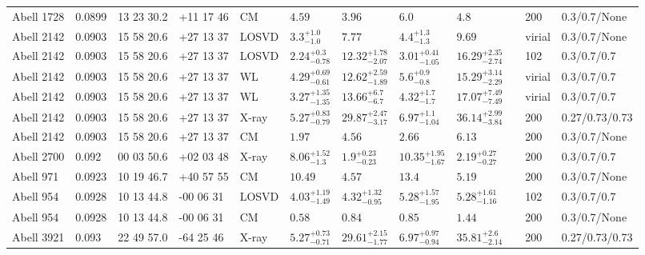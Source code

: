 \begin{landscape}
\begin{center}
{\begin{longtable}{llllllllllll}
Abell 1728 & 0.0899 & 13 23 30.2 & +11 17 46 & CM & ${4.59}^{}_{}$ & ${3.96}^{}_{}$ & ${6.0}^{}_{}$ & ${4.8}^{}_{}$ & \citet{RI06.1} & 200 & 0.3/0.7/None \\
Abell 2142 & 0.0903 & 15 58 20.6 & +27 13 37 & LOSVD & ${3.3}^{+1.0}_{-1.0}$ & ${7.77}^{}_{}$ & ${4.4}^{+1.3}_{-1.3}$ & ${9.69}^{}_{}$ & \citet{AB11.1} & virial & 0.3/0.7/None \\
Abell 2142 & 0.0903 & 15 58 20.6 & +27 13 37 & LOSVD & ${2.24}^{+0.3}_{-0.78}$ & ${12.32}^{+1.78}_{-2.07}$ & ${3.01}^{+0.41}_{-1.05}$ & ${16.29}^{+2.35}_{-2.74}$ & \citet{WO10.1} & 102 & 0.3/0.7/0.7 \\
Abell 2142 & 0.0903 & 15 58 20.6 & +27 13 37 & WL & ${4.29}^{+0.69}_{-0.61}$ & ${12.62}^{+2.59}_{-1.89}$ & ${5.6}^{+0.9}_{-0.8}$ & ${15.29}^{+3.14}_{-2.29}$ & \citet{UM09.1} & virial & 0.3/0.7/0.7 \\
Abell 2142 & 0.0903 & 15 58 20.6 & +27 13 37 & WL & ${3.27}^{+1.35}_{-1.35}$ & ${13.66}^{+6.7}_{-6.7}$ & ${4.32}^{+1.7}_{-1.7}$ & ${17.07}^{+7.49}_{-7.49}$ & \citet{OK08.1} & virial & 0.3/0.7/0.7 \\
Abell 2142 & 0.0903 & 15 58 20.6 & +27 13 37 & X-ray & ${5.27}^{+0.83}_{-0.79}$ & ${29.87}^{+2.47}_{-3.17}$ & ${6.97}^{+1.1}_{-1.04}$ & ${36.14}^{+2.99}_{-3.84}$ & \citet{BA14.1} & 200 & 0.27/0.73/0.73 \\
Abell 2142 & 0.0903 & 15 58 20.6 & +27 13 37 & CM & ${1.97}^{}_{}$ & ${4.56}^{}_{}$ & ${2.66}^{}_{}$ & ${6.13}^{}_{}$ & \citet{RI06.1} & 200 & 0.3/0.7/None \\
Abell 2700 & 0.092 & 00 03 50.6 & +02 03 48 & X-ray & ${8.06}^{+1.52}_{-1.3}$ & ${1.9}^{+0.23}_{-0.23}$ & ${10.35}^{+1.95}_{-1.67}$ & ${2.19}^{+0.27}_{-0.27}$ & \citet{ET11.1} & 200 & 0.3/0.7/0.7 \\
Abell 971 & 0.0923 & 10 19 46.7 & +40 57 55 & CM & ${10.49}^{}_{}$ & ${4.57}^{}_{}$ & ${13.4}^{}_{}$ & ${5.19}^{}_{}$ & \citet{RI06.1} & 200 & 0.3/0.7/None \\
Abell 954 & 0.0928 & 10 13 44.8 & -00 06 31 & LOSVD & ${4.03}^{+1.19}_{-1.49}$ & ${4.32}^{+1.32}_{-0.95}$ & ${5.28}^{+1.57}_{-1.95}$ & ${5.28}^{+1.61}_{-1.16}$ & \citet{WO10.1} & 102 & 0.3/0.7/0.7 \\
Abell 954 & 0.0928 & 10 13 44.8 & -00 06 31 & CM & ${0.58}^{}_{}$ & ${0.84}^{}_{}$ & ${0.85}^{}_{}$ & ${1.44}^{}_{}$ & \citet{RI06.1} & 200 & 0.3/0.7/None \\
Abell 3921 & 0.093 & 22 49 57.0 & -64 25 46 & X-ray & ${5.27}^{+0.73}_{-0.71}$ & ${29.61}^{+2.15}_{-1.77}$ & ${6.97}^{+0.97}_{-0.94}$ & ${35.81}^{+2.6}_{-2.14}$ & \citet{BA14.1} & 200 & 0.27/0.73/0.73 \\

\end{longtable}}
\end{center}
\end{landscape}
